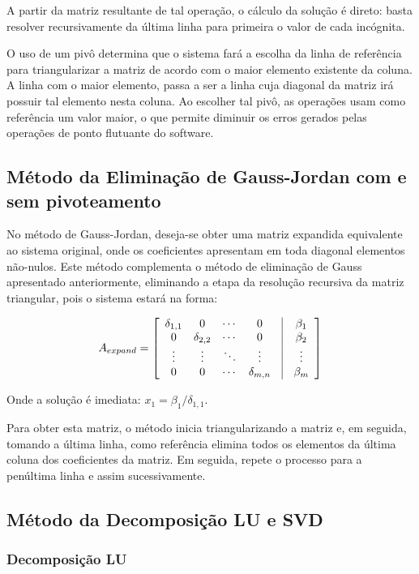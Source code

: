 \documentclass[a4paper,10pt]{report}
\begin{document}
A partir da matriz resultante de tal operação, o cálculo da solução é direto: basta resolver recursivamente da última linha para primeira o valor de cada incógnita.

O uso de um pivô determina que o sistema fará a escolha da linha de referência para triangularizar a matriz de acordo com o maior elemento existente da coluna. A linha com o maior elemento, passa a ser a linha cuja diagonal da matriz irá possuir tal elemento nesta coluna. Ao escolher tal pivô, as operações usam como referência um valor maior, o que permite diminuir os erros gerados pelas operações de ponto flutuante do software.

\subsection{Método da Eliminação de Gauss-Jordan com e sem pivoteamento}

No método de Gauss-Jordan, deseja-se obter uma matriz expandida equivalente ao sistema original, onde os coeficientes apresentam em toda diagonal elementos não-nulos. Este método complementa o método de eliminação de Gauss apresentado anteriormente, eliminando a etapa da resolução recursiva da matriz triangular, pois o sistema estará na forma:

\[
A_{expand} = \left[ \begin{array}{cccccc}
\delta_{1,1} & 0 & \cdots & 0 & \vline & \beta_{1} \\
0 & \delta_{2,2} & \cdots & 0 & \vline & \beta_{2} \\
\vdots  & \vdots & \ddots & \vdots & \vline & \vdots \\
0 & 0 & \cdots & \delta_{m,n} & \vline & \beta_{m} 
\end{array}\right]
\]

Onde a solução é imediata: $x_{1} = \beta_{1}/\delta_{1,1}$.

Para obter esta matriz, o método inicia triangularizando a matriz e, em seguida, tomando a última linha, como referência elimina todos os elementos da última coluna dos coeficientes da matriz. Em seguida, repete o processo para a penúltima linha e assim sucessivamente.

\subsection{Método da Decomposição LU e SVD}

\subsubsection{Decomposição LU}
\end{document}
